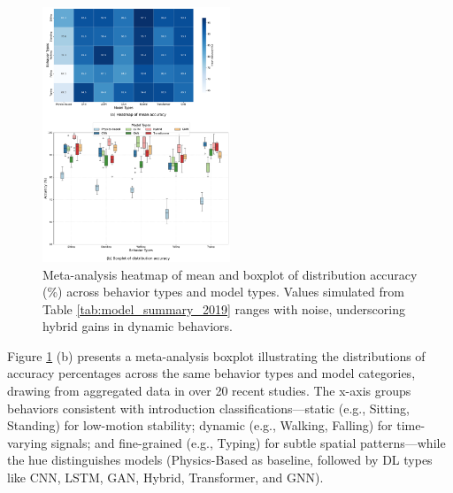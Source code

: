 \documentclass[Afour,sageh,times]{sagej}
\begin{document}
\begin{figure}[htbp]
\centering
\includegraphics[width=0.5\textwidth]{8.meta_accuracy.pdf}
\caption{Meta-analysis heatmap of mean and boxplot of distribution accuracy (\%) across behavior types and model types. Values simulated from Table \ref{tab:model_summary_2019} ranges with noise, underscoring hybrid gains in dynamic behaviors.}
\label{fig:hm_meta_accuracy_behavior_model}
\end{figure}
Figure \ref{fig:hm_meta_accuracy_behavior_model} (b) presents a meta-analysis boxplot illustrating the distributions of accuracy percentages across the same behavior types and model categories, drawing from aggregated data in over 20 recent studies. 
The x-axis groups behaviors consistent with introduction classifications—static (e.g., Sitting, Standing) for low-motion stability; dynamic (e.g., Walking, Falling) for time-varying signals; and fine-grained (e.g., Typing) for subtle spatial patterns—while the hue distinguishes models (Physics-Based as baseline, followed by DL types like CNN, LSTM, GAN, Hybrid, Transformer, and GNN).
\end{document}
